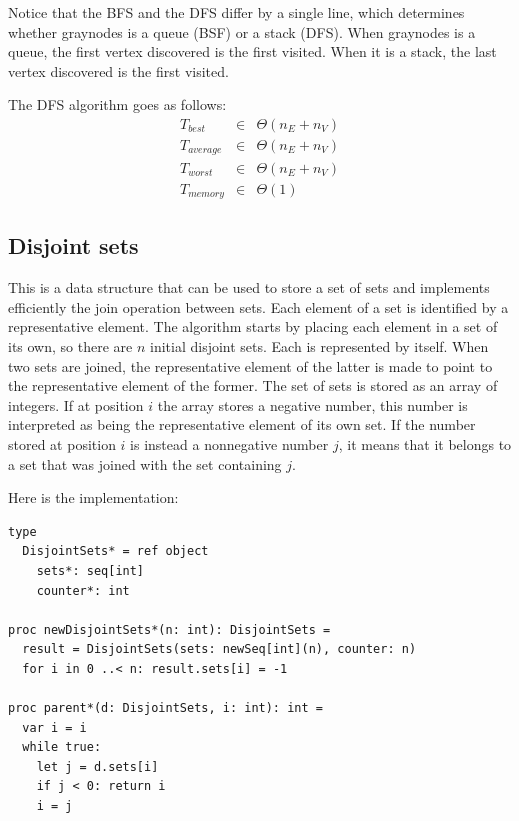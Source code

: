 \documentclass[justified, sixbynine]{tufte-book}
\def\ft{\small\tt}
\theoremstyle{plain}%
\newtheorem * {corollary}{Corollary}
\theoremstyle{definition}
\theoremstyle{remark}
\newtheorem * {remark}{Remark}
\newtheorem * {note}{Note}
\begin{document}
\begin{fullwidth}
Notice that the BFS and the DFS differ by a single line, which determines whether graynodes is a queue (BSF) or a stack (DFS). When graynodes is a queue, the first vertex discovered is the first visited. When it is a stack, the last vertex discovered is the first visited.

The DFS algorithm goes as follows:
\begin{eqnarray}
T_{best} &\in &\Theta (n_E+n_V) \\
T_{average} &\in &\Theta (n_E+n_V) \\
T_{worst} &\in &\Theta (n_E+n_V) \\
T_{memory} &\in &\Theta (1)
\end{eqnarray}

\subsection{Disjoint sets}


This is a data structure that can be used to store a set of sets and implements efficiently the join operation between sets.
Each element of a set is identified by a representative element. The algorithm starts by placing each element in a set of its own, so there are $n$ initial disjoint sets. Each is represented by itself. When two sets are joined, the representative element of the latter is made to point to the representative element of the former. The set of sets is stored as an array of integers. If at position $i$ the array stores a negative number, this number is interpreted as being the representative element of its own set. If the number stored at position $i$ is instead a nonnegative number $j$, it means that it belongs to a set that was joined with the set containing $j$.

Here is the implementation:


\begin{lstlisting}[caption={in file: {\ft nlib.nim}}]
type
  DisjointSets* = ref object
    sets*: seq[int]
    counter*: int

proc newDisjointSets*(n: int): DisjointSets =
  result = DisjointSets(sets: newSeq[int](n), counter: n)
  for i in 0 ..< n: result.sets[i] = -1

proc parent*(d: DisjointSets, i: int): int =
  var i = i
  while true:
    let j = d.sets[i]
    if j < 0: return i
    i = j


\end{lstlisting}
\end{fullwidth}
\end{document}
